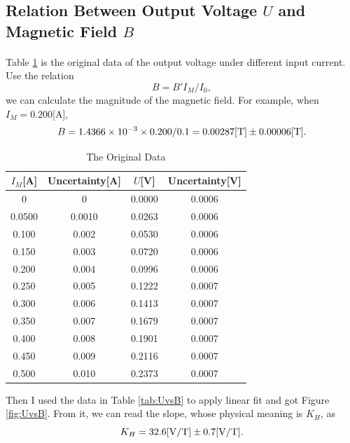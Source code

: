 \documentclass[a4paper]{article}
\begin{document}
    \subsection{Relation Between Output Voltage $U$ and Magnetic Field $B$}\label{sec:2}
    \paragraph{} Table \ref{tab:origin2} is the original data of the output voltage under different input current. Use the relation $$B=B'I_M/I_0,$$ we can calculate the magnitude of the magnetic field. For example, when $I_M=0.200$[A], $$B=1.4366\times 10^{-3} \times 0.200/0.1=0.00287[\rm T]\pm 0.00006[T].$$
    \begin{table}[H]
        \centering
        \begin{tabular}{|c|c|c|c|}
            \hline
            $I_M$[A]&Uncertainty[A]&$U$[V]&Uncertainty[V]\\\hline
            0&0&0.0000&0.0006\\\hline
            0.0500&0.0010&0.0263&0.0006\\\hline
            0.100&0.002&0.0530&0.0006\\\hline
            0.150&0.003&0.0720&0.0006\\\hline
            0.200&0.004&0.0996&0.0006\\\hline
            0.250&0.005&0.1222&0.0007\\\hline
            0.300&0.006&0.1413&0.0007\\\hline
            0.350&0.007&0.1679&0.0007\\\hline
            0.400&0.008&0.1901&0.0007\\\hline
            0.450&0.009&0.2116&0.0007\\\hline
            0.500&0.010&0.2373&0.0007\\\hline
        \end{tabular}
        \caption{The Original Data}
        \label{tab:origin2}
    \end{table}
    Then I used the data in Table \ref{tab:UvsB} to apply linear fit and got Figure \ref{fig:UvsB}. From it, we can read the slope, whose physical meaning is $K_H$, as $$K_H=32.6[\rm V/T]\pm 0.7[V/T].$$
\end{document}
